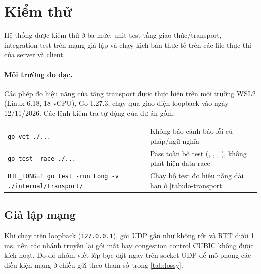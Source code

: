 \section{Kiểm thử}
\label{sec:kiem-thu}

Hệ thống được kiểm thử ở ba mức: unit test tầng giao thức/transport, integration test trên mạng giả lập và chạy
kịch bản thực tế trên các file thực thi của server và client.

\paragraph{Môi trường đo đạc.} Các phép đo hiệu năng của tầng transport được thực hiện trên môi trường WSL2
(Linux 6.18, 18 vCPU), Go 1.27.3, chạy qua giao diện loopback vào ngày 12/11/2026. Các lệnh kiểm tra tự động
của dự án gồm:
\begin{center}
  \small
  \begin{tabularx}{\linewidth}{lY}
    \texttt{go vet ./...} & Không báo cảnh báo lỗi cú pháp/ngữ nghĩa \\
    \texttt{go test -race ./...} & Pass toàn bộ test (, , ,
    ), không phát hiện data race \\
    \texttt{BTL\_LONG=1 go test -run Long -v ./internal/transport/} & Chạy bộ test đo hiệu năng dài hạn ở
    \cref{tab:do-transport}
  \end{tabularx}
\end{center}

\subsection{Giả lập mạng}
\label{subsec:gia-lap}
Khi chạy trên loopback (\texttt{127.0.0.1}), gói UDP gần như không rớt và RTT dưới 1 ms, nên các nhánh truyền lại
gói mất hay congestion control CUBIC không được kích hoạt. Do đó nhóm viết lớp bọc  đặt ngay trên
socket UDP để mô phỏng các điều kiện mạng ở chiều gửi theo tham số trong \cref{tab:lossy}.

